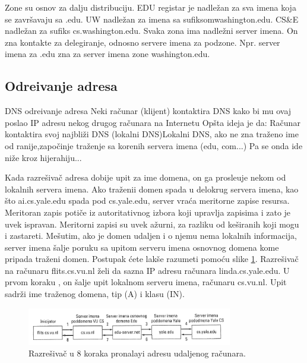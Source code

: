 \documentclass{article} %
\begin{document}
Zone su osnov za dalju distribuciju. EDU registar je nadle\v zan za sva imena koja se zavr\v savaju sa .edu. UW nadle\v zan za imena sa sufiksomwashington.edu. CS\&E nadle\v zan za sufiks cs.washington.edu. Svaka zona ima nadle\v zni server imena. On zna kontakte za delegiranje, odnosno servere imena za podzone. Npr. server imena za .edu zna za server imena zone washington.edu.



\subsection{Odre\dj ivanje adresa}

DNS odre\dj ivanje adresa
Neki ra\v cunar (klijent) kontaktira DNS kako bi mu ovaj poslao IP adresu nekog drugog ra\v cunara na Internetu
Op\v sta ideja je da:
Ra\v cunar kontaktira svoj najbli\v zi DNS (lokalni DNS)Lokalni DNS, ako ne zna tra\v zeno ime od ranije,zapo\v cinje tra\v zenje sa korenih servera imena (edu, com...)
Pa se onda ide ni\v ze kroz hijerahiju...

Kada razre\v siva\v c adresa dobije upit za ime domena, on ga prosle\dj uje nekom od lokalnih servera imena. Ako tra\v zenii domen spada u delokrug servera imena, kao \v sto ai.cs.yale.edu spada pod cs.yale.edu, server vra\' ca meritorne zapise resursa. Meritoran zapis poti\v ce iz autoritativnog izbora koji upravlja zapisima i zato je uvek ispravan. Meritorni zapisi su uvek a\v zurni, za razliku od ke\v siranih koji mogu i zastareti. Me\v sutim, ako je domen udaljen i o njemu nema lokalnih informacija, server imena \v salje poruku  sa upitom serveru imena osnovnog domena kome pripada tra\v zeni domen. Postupak \' cete lak\v se razumeti pomo\' cu slike \ref{odredjivanje adresa}. Razre\v siva\v c na ra\v cunaru flits.cs.vu.nl \v zeli da sazna IP adresu ra\v cunara linda.cs.yale.edu. U prvom koraku , on \v salje upit lokalnom serveru imena, ra\v cunaru cs.vu.nl. Upit sadr\v zi ime tra\v zenog domena, tip (A) i klasu (IN).

\begin{figure}[H]
	\centering
	\includegraphics[width=0.8\textwidth]{slike-aplikativniSloj/razresavanje-adresa.png}
	\caption{Razre\v siva\v c u 8 koraka pronalayi adresu  udaljenog ra\v cunara.}\label{odredjivanje adresa}
\end{figure}
\end{document}
